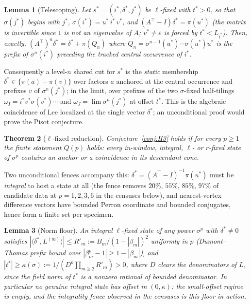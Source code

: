 \documentclass[11pt]{article}
\newtheorem{theorem}{Theorem}[section]
\newtheorem{lemma}[theorem]{Lemma}
\begin{document}
\begin{lemma}[Telescoping]\label{lem:tel}
Let $s^*=(i^*,\delta^*,j^*)$ be $\ell$-fixed with $t^*>0$, so that
$\sigma(j^*)$ begins with $j^*$, $\sigma(i^*)=u^*\,i^*\,v^*$, and
$(A^{\!\top}-I)\delta^*=\pi(u^*)$ (the matrix is invertible since $1$ is
not an eigenvalue of $A$; $v^*\neq\varepsilon$ is forced by
$t^*<L_{i^*}$). Then, exactly,
$(A^{\!\top})^n\delta^*=\delta^*+\pi(Q_n)$ where
$Q_n=\sigma^{n-1}(u^*)\cdots\sigma(u^*)u^*$ is the prefix of
$\sigma^n(i^*)$ preceding the tracked central occurrence of $i^*$.
\end{lemma}

Consequently a level-$n$ shared cut for $s^*$ is the \emph{static}
membership $\delta^*\in\{\pi(a)-\pi(v)\}$ over factors $a$ anchored at
the central occurrence and prefixes $v$ of $\sigma^n(j^*)$; in the limit,
over prefixes of the two $\sigma$-fixed half-tilings
$\omega_I=i^*v^*\sigma(v^*)\cdots$ and $\omega_J=\lim\sigma^n(j^*)$ at
offset $t^*$. This is the algebraic coincidence of Lee \cite{Lee07}
localized at the single vector $\delta^*$; an unconditional proof would
prove the Pisot conjecture.

\begin{theorem}[$\ell$-fixed reduction]\label{thm:lfix}
Conjecture~\ref{conj:H3} holds if for every $p\ge1$ the finite statement
$Q(p)$ holds: every in-window, integral, $\ell$- or $r$-fixed state of
$\sigma^p$ contains an anchor or a coincidence in its descendant cone.
\end{theorem}

Two unconditional fences accompany this: $\delta^*=(A^{\!\top}-I)^{-1}
\pi(u^*)$ must be \emph{integral} to host a state at all (the fence
removes $20\%$, $55\%$, $85\%$, $97\%$ of candidate data at
$p=1,2,3,6$ in the censuses below), and nearest-vertex difference
vectors have bounded Perron coordinate and bounded conjugates, hence
form a finite set per specimen.

\begin{lemma}[Norm floor]\label{lem:floor}
An integral $\ell$-fixed state of any power $\sigma^p$ with
$\delta^*\neq0$ satisfies
$|\langle\delta^*,L^{(m)}\rangle|\le R'_m:=B_m/(1-|\beta_m|)^2$
uniformly in $p$ (Dumont--Thomas prefix bound \cite{DT89} over
$|\beta_m^p-1|\ge1-|\beta_m|$), and
$|t^*|\ge\kappa(\sigma):=1/(D^k\prod_{m\ge2}R'_m)>0$, where $D$ clears
the denominators of $L$, since the field norm of $t^*$ is a nonzero
rational of bounded denominator. In particular no genuine integral
state has offset in $(0,\kappa)$: the small-offset regime is empty, and
the integrality fence observed in the censuses is this floor in action.
\end{lemma}
\end{document}
